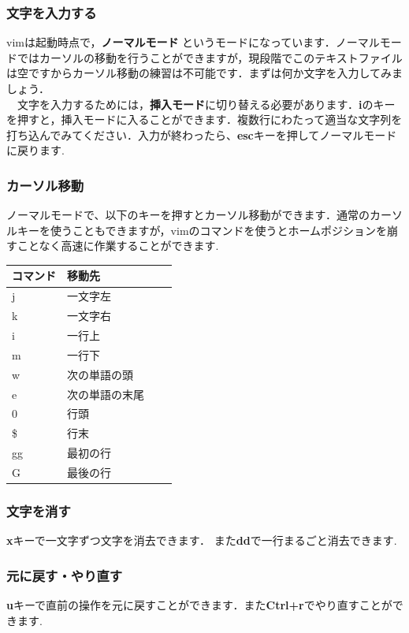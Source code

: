 \documentclass{jarticle}
\begin{document}
\subsubsection{文字を入力する}
vimは起動時点で，{\bf ノーマルモード} というモードになっています．ノーマルモードではカーソルの移動を行うことができますが，現段階でこのテキストファイルは空ですからカーソル移動の練習は不可能です．まずは何か文字を入力してみましょう．\\
　文字を入力するためには，{\bf 挿入モード}に切り替える必要があります．{\bf i}のキーを押すと，挿入モードに入ることができます．複数行にわたって適当な文字列を打ち込んでみてください．入力が終わったら、{\bf esc}キーを押してノーマルモードに戻ります.\

\subsubsection{カーソル移動}
ノーマルモードで、以下のキーを押すとカーソル移動ができます．通常のカーソルキーを使うこともできますが，vimのコマンドを使うとホームポジションを崩すことなく高速に作業することができます.\

\begin{table}[H]
  \centering
  \begin{tabular}{|l|l|l|l|} \hline
    コマンド & 移動先 \\ \hline
    j & 一文字左 \\ \hline
    k & 一文字右 \\ \hline
    i & 一行上 \\ \hline
    m & 一行下 \\ \hline
    w & 次の単語の頭 \\ \hline
    e & 次の単語の末尾 \\ \hline
    0 & 行頭 \\ \hline
    \$ & 行末 \\ \hline
    gg & 最初の行 \\ \hline
    G & 最後の行 \\ \hline
  \end{tabular}
\end{table}

\subsubsection{文字を消す}
{\bf x}キーで一文字ずつ文字を消去できます． また{\bf dd}で一行まるごと消去できます.\

\subsubsection{元に戻す・やり直す}
{\bf u}キーで直前の操作を元に戻すことができます．また{\bf Ctrl+r}でやり直すことができます.\
\end{document}
